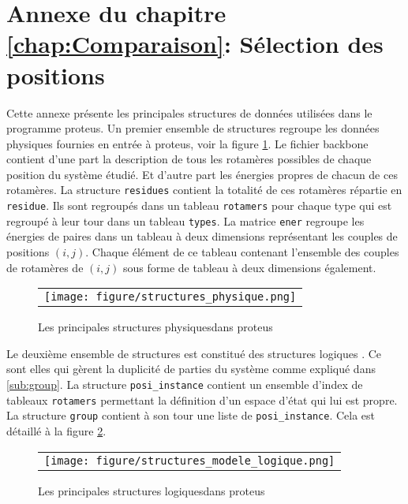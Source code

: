 \chapter*{Annexe du chapitre \ref{chap:Comparaison}: Sélection des positions }
\label{chap:annexeproteus}

Cette annexe présente les principales structures de données utilisées dans le programme proteus. Un premier ensemble de structures regroupe les données physiques fournies en entrée à proteus, voir la figure \ref{fig:structPhy}. Le fichier backbone contient d'une part la description de tous les rotamères possibles de chaque position du système étudié. Et d'autre part les énergies propres de chacun de ces rotamères. La structure \verb!residues! contient la totalité de ces rotamères répartie en \verb!residue!. Ils sont regroupés dans un tableau \verb!rotamers!  pour chaque type qui est regroupé à leur tour dans un tableau \verb!types!. La matrice \verb!ener! regroupe les énergies de paires dans un tableau à deux dimensions représentant les couples de positions $(i,j)$. Chaque élément de ce tableau contenant l'ensemble des couples de rotamères de $(i,j)$  sous forme de tableau à deux dimensions également.

   \begin{figure}[!htbp]
     \centering
     \begin{tabular}{c}
       \texttt{[image: figure/structures\_physique.png]} 
     \end{tabular}
     
     \caption{Les principales structures \og physiques\fg dans proteus}
\label{fig:structPhy}
   \end{figure}

 Le deuxième ensemble de structures est constitué des structures \og logiques \fg. Ce sont elles qui gèrent la duplicité de parties du système comme expliqué dans \ref{sub:group}. La structure \verb!posi_instance! contient un ensemble d'index de tableaux \verb!rotamers! permettant la définition d'un espace d'état qui lui est propre. La structure \verb!group! contient à son tour une liste de \verb!posi_instance!. Cela est détaillé à la figure  \ref{fig:structLog}.   

 
   \begin{figure}[!htbp]
     \centering
     \begin{tabular}{c}
       \texttt{[image: figure/structures\_modele\_logique.png]} 
     \end{tabular}
     
     \caption{Les principales structures \og logiques\fg dans proteus}
\label{fig:structLog}
   \end{figure}

